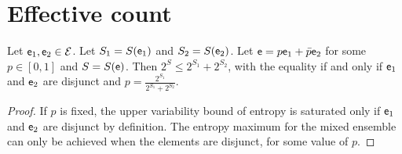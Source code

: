 \section{Effective count}

\begin{prop}\label{pm_es_exponentialEntropySubadditivity}
	Let $\mathsf{e}_1, \mathsf{e}_2 \in \mathcal{E}$. Let $S_1 = S(\mathsf{e}_1)$ and $S_2 = S(\mathsf{e}_2)$. Let $\mathsf{e} = p \mathsf{e}_1 + \bar{p} \mathsf{e}_2$ for some $p \in [0,1]$ and $S = S(\mathsf{e})$. Then $2^S \leq 2^{S_1} + 2^{S_2}$, with the equality if and only if $\mathsf{e}_1$ and $\mathsf{e}_2$ are disjunct and $p = \frac{2^{S_1}}{2^{S_1} + 2^{S_2}}$.
\end{prop}

\begin{proof}
	If $p$ is fixed, the upper variability bound of entropy is saturated only if $\mathsf{e}_1$ and $\mathsf{e}_2$ are disjunct by definition. The entropy maximum for the mixed ensemble can only be achieved when the elements are disjunct, for some value of $p$.
	

\end{proof}
